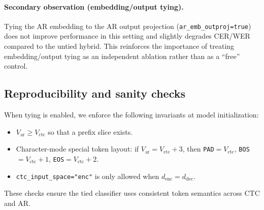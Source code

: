 \paragraph{Secondary observation (embedding/output tying).}
Tying the AR embedding to the AR output projection (\texttt{ar\_emb\_outproj=true}) does not improve performance in this setting and slightly degrades CER/WER compared to the untied hybrid.
This reinforces the importance of treating embedding/output tying as an independent ablation rather than as a ``free'' control.

\subsection{Reproducibility and sanity checks}
When tying is enabled, we enforce the following invariants at model initialization:
\begin{itemize}
  \item $V_{\text{ar}} \ge V_{\text{ctc}}$ so that a prefix slice exists.
  \item Character-mode special token layout: if $V_{\text{ar}} = V_{\text{ctc}} + 3$, then \texttt{PAD}$=V_{\text{ctc}}$, \texttt{BOS}$=V_{\text{ctc}}+1$, \texttt{EOS}$=V_{\text{ctc}}+2$.
  \item \texttt{ctc\_input\_space="enc"} is only allowed when $d_{\text{enc}}=d_{\text{dec}}$.
\end{itemize}
These checks ensure the tied classifier uses consistent token semantics across CTC and AR.

